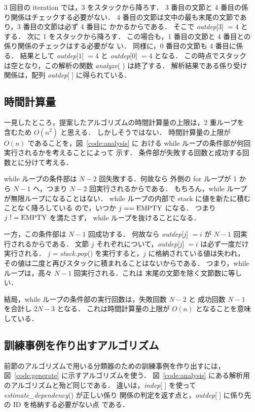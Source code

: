 \documentclass[japanese]{jnlp_1.2c}
\begin{document}
3 回目の iteration では，3 をスタックから降ろす．
3 番目の文節と 4 番目の係り関係はチェックする必要がない．
4 番目の文節は文中の最も末尾の文節であり，3 番目の文節は必ず 4 番目に
かかるからである．
そこで {\it outdep}[$3$] $= 4$ とする．
次に 1 をスタックから降ろす．
この場合も，1 番目の文節と 4 番目との係り関係のチェックはする必要がな
い．
同様に，0 番目の文節も 4 番目に係る．
結果として {\it outdep}[$1$] $= 4$ と {\it outdep}[$0$] $= 4$ となる．
この時点でスタックは空となり，この解析の関数 {\it analyze}( ) は終了する．
解析結果である係り受け関係は，配列 \linebreak
{\it outdep}[ ] に得られている．

\subsection{時間計算量}\label{subsec:time}
一見したところ，提案したアルゴリズムの時間計算量の上限は，2 重ループを
含むため $O(n^{2})$ と思える．
しかしそうではない．
時間計算量の上限が $O(n)$ であることを，図~\ref{code:analysis} に
おける {\rm while} ループの条件部が何回実行されるかを考えることによって
示す．
条件部が失敗する回数と成功する回数とに分けて考える．

{\rm while} ループの条件部は $N - 2$ 回失敗する．何故なら
外側の {\rm for} ループが 1 から $N-1$ へ，つまり $N - 2$ 回実行されるからである．
もちろん，{\rm while} ループが無限ループになることはない．
{\rm while} ループの内部で stack に値を新たに積むことなく降ろしている
ので，いつか $j == {\rm EMPTY}$ になる．
つまり $j\  != {\rm EMPTY}$ を満たさず，
{\rm while} ループを抜けることになる．


一方，この条件部は $N - 1$ 回成功する．
何故なら {\it outdep}[$j$] $= i$ が $N - 1$ 回実行されるからである．
文節 $j$ それぞれについて，{\it outdep}[$j$] $= i$ は必ず一度だけ実行される．
{\it j = stack.pop}() を実行すると，$j$ に格納されている値は失われ，
その値は二度と再びスタックに積まれることはないからである．
つまり，{\rm while} ループは，高々 $N - 1$ 回実行される．これは
末尾の文節を除く文節数に等しい．

結局，{\rm while} ループの条件部の実行回数は，失敗回数 $N - 2$ と 
成功回数 $N - 1$ を合計し $2N - 3$ となる．
これは時間計算量の上限が $O(n)$ となることを意味している．


\subsection{訓練事例を作り出すアルゴリズム}
前節のアルゴリズムで用いる分類器のための訓練事例を作り出すには，
図~\ref{code:generate} に示すアルゴリズムを使う．
図~\ref{code:analysis} にある解析用のアルゴリズムと殆ど同じである．
違いは，{\it indep}[ ] を使って {\it estimate\_dependency}() が正しい係り
関係の判定を返す点と，{\it outdep}[ ] に係り先の ID を格納する必要がない点
である．
\end{document}
